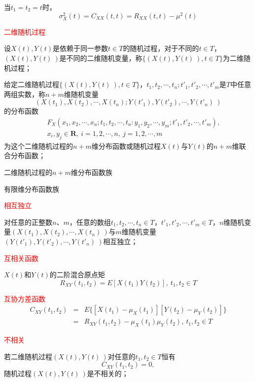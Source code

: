 \documentclass[12pt,a4paper]{article}
\begin{document}
当$t_1 = t_2 = t$时，
\begin{equation}
\sigma_X^2 (t) = C_{XX} (t,t) = R_{XX} (t,t) -\mu^2 (t)
\end{equation}

\textcolor{red}{二维随机过程}

设$X(t), Y(t)$是依赖于同一参数$t\in T$的随机过程，对于不同的$t\in T$，$(X(t), Y(t)~)$是不同的二维随机变量，称$\{(X(t), Y(t)~), t\in T\}$为二维随机过程；

给定二维随机过程$\{(X(t), Y(t)~), t\in T\}$，$t_1, t_2, \cdots, t_n; t'_1, t'_2, \cdots, t'_m$是$T$中任意两组实数，称$n+m$维随机变量
\begin{equation}
(X(t_1), X(t_2), \cdots, X(t_n); Y(t'_1), Y(t'_2), \cdots, Y(t'_n)~)
\end{equation}
的分布函数
\begin{eqnarray}
\nonumber && F_X (x_1, x_2, \cdots, x_n; t_1, t_2, \cdots, t_n : y_1, y_2, \cdots, y_m; t'_1, t'_2, \cdots, t'_m), \\
&& x_i, y_j \in \mathbf{R}, ~ i = 1, 2, \cdots, n, ~ j = 1, 2, \cdots, m
\end{eqnarray}
为这个二维随机过程的$n+m$维分布函数或随机过程$X(t)$与$Y(t)$的$n+m$维联合分布函数；

二维随机过程的$n+m$维分布函数族

有限维分布函数族

\textcolor{red}{相互独立}

对任意的正整数$n$、$m$，任意的数组$t_1, t_2, \cdots, t_n \in T$，$t'_1, t'_2, \cdots, t'_m \in T$，$n$维随机变量$(X(t_1), X(t_2), \cdots, X(t_n)~)$与$m$维随机变量$(Y(t'_1), Y(t'_2), \cdots, Y(t'_n)~)$相互独立；

\textcolor{red}{互相关函数}

$X(t)$和$Y(t)$的二阶混合原点矩
\begin{equation}
R_{XY}(t_1, t_2) = E[X(t_1)Y(t_2)], ~ t_1, t_2\in T
\end{equation}

\textcolor{red}{互协方差函数}
\begin{eqnarray}
\nonumber C_{XY}(t_1, t_2) &=& E\{[X(t_1) -\mu_X(t_1)][Y(t_2) -\mu_Y(t_2)] \} \\
&=& R_{XY}(t_1, t_2) -\mu_X(t_1)\mu_Y(t_2), ~ t_1, t_2 \in T
\end{eqnarray}

\textcolor{red}{不相关}

若二维随机过程$(X(t), Y(t)~)$对任意的$t_1, t_2\in T$恒有
\begin{equation}
C_{XY}(t_1, t_2) = 0,
\end{equation}
随机过程$(X(t), Y(t)~)$是不相关的；
\end{document}
